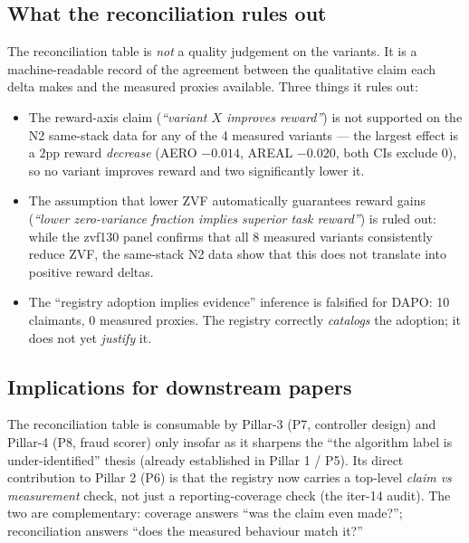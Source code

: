 \subsection{What the reconciliation rules out}
The reconciliation table is \emph{not} a quality judgement on the
variants. It is a machine-readable record of the agreement between the
qualitative claim each delta makes and the measured proxies available.
Three things it rules out:

\begin{itemize}
  \item The reward-axis claim (\emph{``variant $X$ improves reward''})
    is not supported on the N2 same-stack data for any of the 4
    measured variants --- the largest effect is a $2$pp reward
    \emph{decrease} (AERO $-0.014$, AREAL $-0.020$, both CIs exclude 0),
    so no variant improves reward and two significantly lower it.
  \item The assumption that lower ZVF automatically guarantees reward gains
    (\emph{``lower zero-variance fraction implies superior task reward''})
    is ruled out: while the zvf130 panel confirms that all 8 measured variants
    consistently reduce ZVF, the same-stack N2 data show that this does not
    translate into positive reward deltas.
  \item The ``registry adoption implies evidence'' inference is
    falsified for DAPO: 10 claimants, 0 measured proxies. The registry
    correctly \emph{catalogs} the adoption; it does not yet
    \emph{justify} it.
\end{itemize}

\subsection{Implications for downstream papers}
The reconciliation table is consumable by Pillar-3 (P7, controller
design) and Pillar-4 (P8, fraud scorer) only insofar as it sharpens
the ``the algorithm label is under-identified'' thesis (already
established in Pillar 1 / P5). Its direct contribution to Pillar 2
(P6) is that the registry now carries a top-level \emph{claim vs
measurement} check, not just a reporting-coverage check (the iter-14
audit). The two are complementary: coverage answers ``was the claim
even made?''; reconciliation answers ``does the measured behaviour
match it?''
